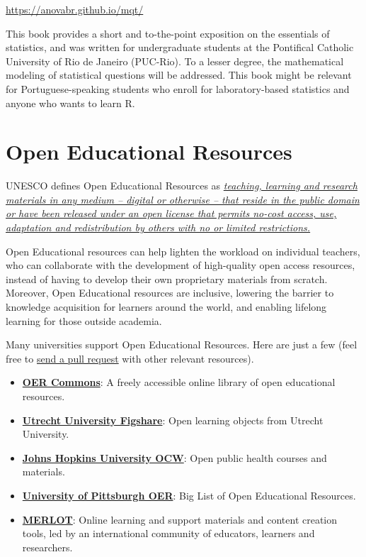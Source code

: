 \documentclass[
]{book}
\providecommand{\tightlist}{%
  \setlength{\itemsep}{0pt}\setlength{\parskip}{0pt}}
\begin{document}
\url{https://anovabr.github.io/mqt/}

This book provides a short and to-the-point exposition on the essentials of statistics, and was written for undergraduate students at the Pontifical Catholic University of Rio de Janeiro (PUC-Rio). To a lesser degree, the mathematical modeling of statistical questions will be addressed. This book might be relevant for Portuguese-speaking students who enroll for laboratory-based statistics and anyone who wants to learn R.

\hypertarget{open-educational-resources}{%
\chapter{Open Educational Resources}\label{open-educational-resources}}

UNESCO defines Open Educational Resources as \href{https://en.unesco.org/themes/building-knowledge-societies/oer}{\emph{teaching, learning and research materials in any medium -- digital or otherwise -- that reside in the public domain or have been released under an open license that permits no-cost access, use, adaptation and redistribution by others with no or limited restrictions.}}

Open Educational resources can help lighten the workload on individual teachers, who can collaborate with the development of high-quality open access resources, instead of having to develop their own proprietary materials from scratch. Moreover, Open Educational resources are inclusive, lowering the barrier to knowledge acquisition for learners around the world, and enabling lifelong learning for those outside academia.

Many universities support Open Educational Resources. Here are just a few (feel free to \href{https://help.github.com/en/github/collaborating-with-issues-and-pull-requests/creating-a-pull-request}{send a pull request} with other relevant resources).

\begin{itemize}
\tightlist
\item
  \href{https://www.oercommons.org/}{\textbf{OER Commons}}: A freely accessible online library of open educational resources.
\item
  \href{https://uu.figshare.com/}{\textbf{Utrecht University Figshare}}: Open learning objects from Utrecht University.
\item
  \href{https://ocw.jhsph.edu/}{\textbf{Johns Hopkins University OCW}}: Open public health courses and materials.
\item
  \href{https://pitt.libguides.com/openeducation/biglist}{\textbf{University of Pittsburgh OER}}: Big List of Open Educational Resources.
\item
  \href{https://www.merlot.org/merlot/}{\textbf{MERLOT}}: Online learning and support materials and content creation tools, led by an international community of educators, learners and researchers.
\end{itemize}
\end{document}
